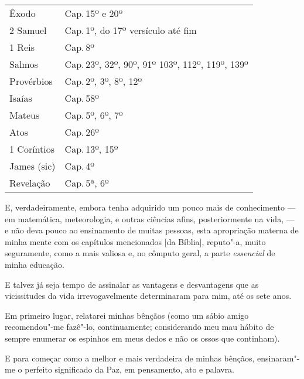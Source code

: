 {{{{{{{{{{{{{{{\begin{table}[!htpb]
\begin{tabular}{ll}
Êxodo       & Cap.\,15º e 20º                                 \\
2 Samuel    & Cap.\,1º, do 17º versículo até fim               \\
1 Reis      & Cap.\,8º                                         \\
Salmos      & Cap.\,23º, 32º, 90º, 91º 103º, 112º, 119º, 139º \\
Provérbios  & Cap.\,2º, 3º, 8º, 12º                           \\
Isaías      & Cap.\,58º                                        \\
Mateus      & Cap.\,5º, 6º, 7º                                \\
Atos        & Cap.\,26º                                        \\
1 Coríntios & Cap.\,13º, 15º                                \\
James (sic) & Cap.\,4º                                         \\
Revelação   & Cap.\,5ª, 6º                                   
\end{tabular}
\end{table}

\noindent{}E, verdadeiramente, embora tenha adquirido um pouco mais de conhecimento
--- em matemática, meteorologia, e outras ciências afins, posteriormente
na vida, --- e não deva pouco ao ensinamento de muitas pessoas, esta
apropriação materna de minha mente com os capítulos mencionados {[}da
Bíblia{]}, reputo"-a, muito seguramente, como a mais valiosa e, no
cômputo geral, a parte \textit{essencial} de minha educação.

E talvez já seja tempo de assinalar as vantagens e desvantagens que as
vicissitudes da vida irrevogavelmente determinaram para mim, até os sete
anos.

Em primeiro lugar, relatarei minhas bênçãos (como um sábio amigo
recomendou"-me fazê"-lo, continuamente; considerando meu mau hábito de
sempre enumerar os espinhos em meus dedos e não os ossos que continham).

E para começar como a melhor e mais verdadeira de minhas bênçãos,
ensinaram"-me o perfeito significado da Paz, em pensamento, ato e
palavra.

}}}}}}}}}}}}}}}
